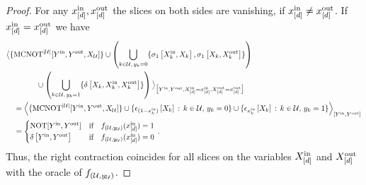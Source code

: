 \begin{proof}
    For any $x_{[d]}^{\mathrm{in}},x_{[d]}^{\mathrm{out}}$ the slices on both sides are vanishing, if $x_{[d]}^{\mathrm{in}}\neq x_{[d]}^{\mathrm{out}}$.
    If $x_{[d]}^{\mathrm{in}}=x_{[d]}^{\mathrm{out}}$ we have
    \begin{align*}
        &\big\langle 
            \{\mathrm{MCNOT}^{\left|\mathcal{U}\right|}[Y^{\mathrm{in}},Y^{\mathrm{out}},X_{\mathcal{U}}]\}
            \cup \left(\bigcup_{k\in\mathcal{U},\,y_{k}=0}\{\sigma_1\left[X_{k}^{\mathrm{in}},X_{k}\right],
                     \sigma_1\left[X_{k},X_{k}^{\mathrm{out}}\right]\}\right) \\
            &\quad\quad\quad\quad \cup \left(\bigcup_{k\in\mathcal{U},\,y_{k}=1}\{
                                           \delta\left[X_{k},X_{k}^{\mathrm{in}},X_{k}^{\mathrm{out}}\right]
                                           \}\right)
         \big\rangle_{\big[ 
            Y^{\mathrm{in}},Y^{\mathrm{out}},X_{[d]}^{\mathrm{in}}=x_{[d]}^{\mathrm{in}},X_{[d]}^{\mathrm{out}}=x_{[d]}^{\mathrm{out}}
         \big]} \\
        & \quad = \left\langle \{\mathrm{MCNOT}^{\left|\mathcal{U}\right|}[Y^{\mathrm{in}},Y^{\mathrm{out}},X_{\mathcal{U}}]\}
            \cup\{\epsilon_{(1-x_{k}^{\mathrm{in}})}\left[X_{k}\right] \,:\, k\in\mathcal{U},\,y_{k}=0\}
            \cup\{\epsilon_{x_{k}^{\mathrm{in}}}\left[X_{k}\right] \,:\, k\in\mathcal{U},\,y_{k}=1\}
        \right\rangle_{\left[  Y^{\mathrm{in}},Y^{\mathrm{out}} \right]}\\
        & \quad =
        \begin{cases}
            \mathrm{NOT}[Y^{\mathrm{in}},Y^{\mathrm{out}}] & \text{if}\quad f_{(\mathcal{U},y_{\mathcal{U}})}(x_{[d]}^{\mathrm{in}})=1 \\
            \delta\left[Y^{\mathrm{in}},Y^{\mathrm{out}}\right] & \text{if}\quad f_{(\mathcal{U},y_{\mathcal{U}})}(x_{[d]}^{\mathrm{in}})=0
        \end{cases} \, .
    \end{align*}
    Thus, the right contraction coincides for all slices on the variables $X_{[d]}^{\mathrm{in}}$ and $X_{[d]}^{\mathrm{out}}$ with the oracle of $f_{(\mathcal{U},y_{\mathcal{U}})}$.
\end{proof}

